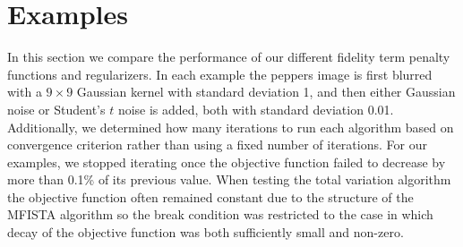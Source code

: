 \documentclass[10pt,a4paper]{article}
\begin{document}
	\section{Examples}
	
	In this section we compare the performance of our different fidelity term penalty functions and regularizers. In each example the peppers image is first blurred with a $9 \times 9$ Gaussian kernel with standard deviation 1, and then either Gaussian noise or Student's $t$ noise is added, both with standard deviation 0.01. Additionally, we determined how many iterations to run each algorithm based on convergence criterion rather than using a fixed number of iterations. For our examples, we stopped iterating once the objective function failed to decrease by more than 0.1\% of its previous value.  When testing the total variation algorithm the objective function often remained constant due to the structure of the MFISTA algorithm so the break condition was restricted to the case in which decay of the objective function was both sufficiently small and non-zero.
	
%	
%
%	
	
\end{document}
